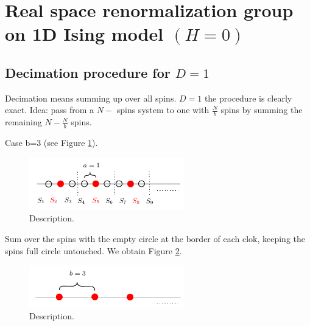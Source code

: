 \documentclass[../main/main.tex]{subfiles}
\begin{document}
\section{Real space renormalization group on 1D Ising model \( (H=0) \)}
\subsection{Decimation procedure for \( D=1 \)}
Decimation means summing up over all spins.
\( D=1 \) the procedure is clearly exact. Idea: pass from a \( N- \) spins system to one with \( \frac{N}{b} \) spins by summing the remaining \( N- \frac{N}{b} \) spins.


Case b=3 (see Figure \ref{fig:20_1}).

\begin{figure}[h!]
\centering
\includegraphics[width=0.6\textwidth]{../lessons/20_image/1.pdf}
\caption{\label{fig:20_1} Description.}
\end{figure}

Sum over the spins with the empty circle at the border of each clok, keeping the spins full circle untouched.
We obtain Figure \ref{fig:20_2}.

\begin{figure}[h!]
\centering
\includegraphics[width=0.6\textwidth]{../lessons/20_image/2.pdf}
\caption{\label{fig:20_2} Description.}
\end{figure}
\end{document}
